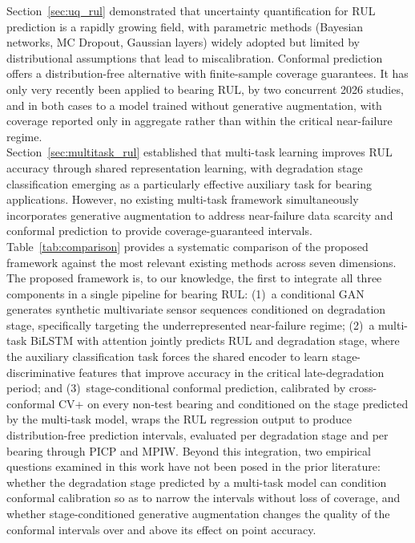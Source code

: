 Section~\ref{sec:uq_rul} demonstrated that uncertainty quantification
for RUL prediction is a rapidly growing field, with parametric methods
(Bayesian networks, MC Dropout, Gaussian layers) widely adopted but
limited by distributional assumptions that lead to miscalibration.
Conformal prediction offers a distribution-free alternative with
finite-sample coverage guarantees. It has only very recently been
applied to bearing RUL, by two concurrent 2026 studies, and in both
cases to a model trained without generative augmentation, with coverage
reported only in aggregate rather than within the critical near-failure
regime.\\

Section~\ref{sec:multitask_rul} established that multi-task learning
improves RUL accuracy through shared representation learning,
with degradation stage classification emerging as a particularly
effective auxiliary task for bearing applications. However, no
existing multi-task framework simultaneously incorporates generative
augmentation to address near-failure data scarcity and conformal
prediction to provide coverage-guaranteed intervals.\\

Table~\ref{tab:comparison} provides a systematic comparison of the
proposed framework against the most relevant existing methods across
seven dimensions. The proposed framework is, to our knowledge, the
first to integrate all three components in a single pipeline for
bearing RUL: (1)~a conditional GAN generates synthetic multivariate
sensor sequences conditioned on degradation stage, specifically
targeting the underrepresented near-failure regime; (2)~a multi-task
BiLSTM with attention jointly predicts RUL and degradation stage,
where the auxiliary classification task forces the shared encoder to
learn stage-discriminative features that improve accuracy in the
critical late-degradation period; and (3)~stage-conditional conformal
prediction, calibrated by cross-conformal CV+ on every non-test
bearing and conditioned on the stage predicted by the multi-task
model, wraps the RUL regression output to produce distribution-free
prediction intervals, evaluated per degradation stage and per bearing
through PICP and MPIW. Beyond this integration, two empirical
questions examined in this work have not been posed in the prior
literature: whether the degradation stage predicted by a multi-task
model can condition conformal calibration so as to narrow the
intervals without loss of coverage, and whether stage-conditioned
generative augmentation changes the quality of the conformal
intervals over and above its effect on point accuracy.


